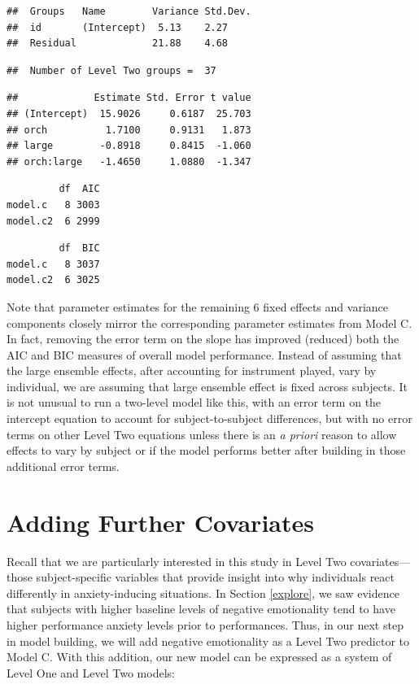 \documentclass[
]{krantz}
\begin{document}
\begin{verbatim}
##  Groups   Name        Variance Std.Dev.
##  id       (Intercept)  5.13    2.27    
##  Residual             21.88    4.68
\end{verbatim}

\begin{verbatim}
##  Number of Level Two groups =  37
\end{verbatim}

\begin{verbatim}
##             Estimate Std. Error t value
## (Intercept)  15.9026     0.6187  25.703
## orch          1.7100     0.9131   1.873
## large        -0.8918     0.8415  -1.060
## orch:large   -1.4650     1.0880  -1.347
\end{verbatim}

\begin{verbatim}
         df  AIC
model.c   8 3003
model.c2  6 2999
\end{verbatim}

\begin{verbatim}
         df  BIC
model.c   8 3037
model.c2  6 3025
\end{verbatim}

Note that parameter estimates for the remaining 6 fixed effects and variance components closely mirror the corresponding parameter estimates from Model C. In fact, removing the error term on the slope has improved (reduced) both the AIC and BIC measures of overall model performance. Instead of assuming that the large ensemble effects, after accounting for instrument played, vary by individual, we are assuming that large ensemble effect is fixed across subjects. It is not unusual to run a two-level model like this, with an error term on the intercept equation to account for subject-to-subject differences, but with no error terms on other Level Two equations unless there is an \emph{a priori} reason to allow effects to vary by subject or if the model performs better after building in those additional error terms.

\hypertarget{sec:modeld}{%
\section{Adding Further Covariates}\label{sec:modeld}}

Recall that we are particularly interested in this study in Level Two covariates---those subject-specific variables that provide insight into why individuals react differently in anxiety-inducing situations. In Section \ref{explore}, we saw evidence that subjects with higher baseline levels of negative emotionality tend to have higher performance anxiety levels prior to performances. Thus, in our next step in model building, we will add negative emotionality as a Level Two predictor to Model C. With this addition, our new model can be expressed as a system of Level One and Level Two models:
\end{document}
